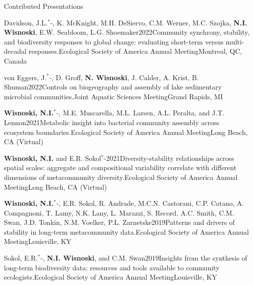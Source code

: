 \documentclass{resume} %
\newcommand{\Star}{\ensuremath{^*}\kern-\scriptspace}
\begin{document}
\begin{rhangSection}{Contributed Presentations}
\begin{Presentation}{Davidson, J.L.\Star, K. McKnight, M.H. DeSiervo, C.M. Werner, M.C. Szojka, {\bf N.I. Wisnoski}, E.W. Seabloom, L.G. Shoemaker}{2022}{Community synchrony, stability, and biodiversity responses to global change: evaluating short-term versus multi-decadal responses.}{Ecological Society of America Annual Meeting}{Montreal, QC, Canada}
\end{Presentation}

\begin{Presentation}{von Eggers, J.\Star, D. Groff, {\bf N. Wisnoski}, J. Calder, A. Krist, B. Shuman}{2022}{Controls on biogeography and assembly of lake sedimentary microbial communities.}{Joint Aquatic Sciences Meeting}{Grand Rapids, MI}
\end{Presentation}

\begin{Presentation}{{\bf Wisnoski, N.I.}\Star, M.E. Muscarella, M.L. Larsen, A.L. Peralta, and J.T. Lennon}{2021}{Metabolic insight into bacterial community assembly across ecosystem boundaries.}{Ecological Society of America Annual Meeting}{Long Beach, CA (Virtual)}
    \end{Presentation}
    
\begin{Presentation}{{\bf Wisnoski, N.I.} and E.R. Sokol\Star}{2021}{Diversity-stability relationships across spatial scales: aggregate and compositional variability correlate with different dimensions of metacommunity diversity.}{Ecological Society of America Annual Meeting}{Long Beach, CA (Virtual)}
\end{Presentation}

\begin{Presentation}{{\bf Wisnoski, N.I.}\Star, E.R. Sokol, R. Andrade, M.C.N. Castorani, C.P. Catano, A. Compagnoni, T. Lamy, N.K. Lany, L. Marazzi, S. Record, A.C. Smith, C.M. Swan, J.D. Tonkin, N.M. Voelker, P.L. Zarnetske}{2019}{Patterns and drivers of stability in long-term metacommunity data.}{Ecological Society of America Annual Meeting}{Louisville, KY}
\end{Presentation}
  
\begin{Presentation}{Sokol, E.R.\Star, {\bf N.I. Wisnoski}, and C.M. Swan}{2019}{Insights from the synthesis of long-term biodiversity data: resources and tools available to community ecologists.}{Ecological Society of America Annual Meeting}{Louisville, KY}
\end{Presentation}
  

\end{rhangSection}
\end{document}
